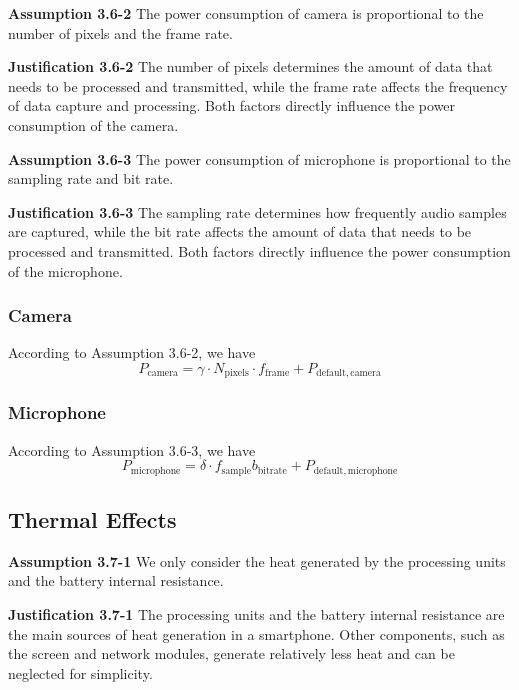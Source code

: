 \documentclass[12pt]{article}
\begin{document}
\noindent \textbf{Assumption 3.6-2} \quad The power consumption of camera is proportional to the number of pixels and the frame rate.

\noindent \textbf{Justification 3.6-2} \quad The number of pixels determines the amount of data that needs to be processed and transmitted, while the frame rate affects the frequency of data capture and processing. Both factors directly influence the power consumption of the camera.

\noindent \textbf{Assumption 3.6-3} \quad The power consumption of microphone is proportional to the sampling rate and bit rate.

\noindent \textbf{Justification 3.6-3} \quad The sampling rate determines how frequently audio samples are captured, while the bit rate affects the amount of data that needs to be processed and transmitted. Both factors directly influence the power consumption of the microphone.

\subsubsection{Camera}

According to Assumption 3.6-2, we have
\begin{equation}
	P_\mathrm{camera}=\gamma\cdot N_\mathrm{pixels}\cdot f_\mathrm{frame}+P_\mathrm{default,camera}
\end{equation}

\subsubsection{Microphone}

According to Assumption 3.6-3, we have
\begin{equation}
	P_\mathrm{microphone}=\delta\cdot f_\mathrm{sample}b_\mathrm{bitrate}+P_\mathrm{default,microphone}
\end{equation}

\subsection{Thermal Effects}

\noindent \textbf{Assumption 3.7-1} \quad We only consider the heat generated by the processing units and the battery internal resistance.

\noindent \textbf{Justification 3.7-1} \quad The processing units and the battery internal resistance are the main sources of heat generation in a smartphone. Other components, such as the screen and network modules, generate relatively less heat and can be neglected for simplicity.
\end{document}
